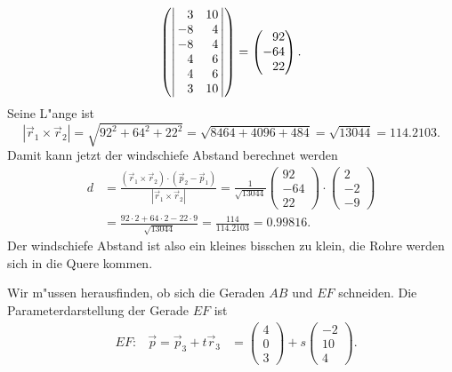 \begin{loesung}
\begin{teilaufgaben}
\begin{align*}
{\begin{pmatrix}
{\left|\,\begin{matrix}\phantom{-}3&          10\\         - 8&\phantom{1}4\end{matrix}\,\right|}\\
{\def\arraystretch{1.0}
\left|\,\begin{matrix}         - 8&\phantom{1}4\\\phantom{-}4&\phantom{1}6\end{matrix}\,\right|}\\
{\def\arraystretch{1.0}
\left|\,\begin{matrix}\phantom{-}4&\phantom{1}6\\\phantom{-}3&          10\end{matrix}\,\right|}
\end{pmatrix}}
=
\begin{pmatrix}
\phantom{-}92\\-64\\\phantom{-}22
\end{pmatrix}.
\end{align*}
Seine L"ange ist 
\[
|\vec{r}_1\times\vec{r}_2|
=
\sqrt{92^2+64^2+22^2}=\sqrt{8464+4096+484}=\sqrt{13044}=114.2103.
\]
Damit kann jetzt der windschiefe Abstand berechnet werden
\begin{align*}
d
&=
\frac{(\vec{r}_1\times\vec{r}_2)\cdot (\vec{p}_2 - \vec{p}_1)}{|\vec{r}_1\times \vec{r}_2|}
=
\frac1{\sqrt{13044}}
\begin{pmatrix}92\\-64\\22\end{pmatrix}
\cdot
\begin{pmatrix}2\\-2\\-9 \end{pmatrix}
\\
&=
\frac{92\cdot 2+64\cdot 2-22\cdot 9}{\sqrt{13044}}=\frac{114}{114.2103}=0.99816.
\end{align*}
Der windschiefe Abstand ist also ein kleines bisschen zu klein, die Rohre
werden sich in die Quere kommen.
\item
Wir m"ussen herausfinden, ob sich die Geraden $AB$ und $EF$ schneiden.
Die Parameterdarstellung der Gerade $EF$ ist
\[
\begin{aligned}
&EF:&\vec{p}=\vec{p}_3+t\vec{r}_3
&=
\begin{pmatrix}4\\0\\3\end{pmatrix} + s\begin{pmatrix}-2\\10\\4\end{pmatrix}.

\end{aligned}\]
\end{teilaufgaben}
\end{loesung}
